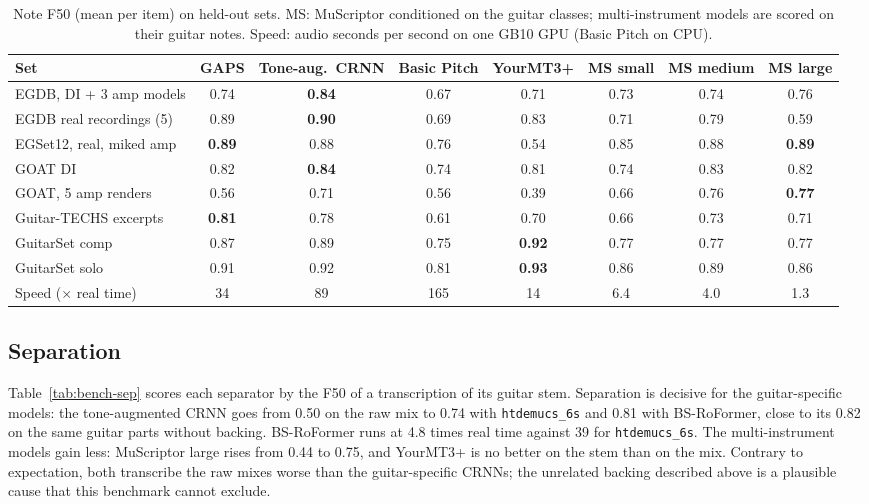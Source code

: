 \begin{table}[t]
\centering
\caption{Note F50 (mean per item) on held-out sets. MS: MuScriptor
conditioned on the guitar classes; multi-instrument models are scored on
their guitar notes. Speed: audio seconds per second on one GB10 GPU (Basic
Pitch on CPU).}
\label{tab:bench-notes}
\footnotesize
\begin{tabular}{@{}lccccccc@{}}
\toprule
Set & GAPS & Tone-aug.\ CRNN & Basic Pitch & YourMT3+ & MS small & MS medium & MS large \\
\midrule
EGDB, DI + 3 amp models & 0.74 & \textbf{0.84} & 0.67 & 0.71 & 0.73 & 0.74 & 0.76 \\
EGDB real recordings (5) & 0.89 & \textbf{0.90} & 0.69 & 0.83 & 0.71 & 0.79 & 0.59 \\
EGSet12, real, miked amp & \textbf{0.89} & 0.88 & 0.76 & 0.54 & 0.85 & 0.88 & \textbf{0.89} \\
GOAT DI & 0.82 & \textbf{0.84} & 0.74 & 0.81 & 0.74 & 0.83 & 0.82 \\
GOAT, 5 amp renders & 0.56 & 0.71 & 0.56 & 0.39 & 0.66 & 0.76 & \textbf{0.77} \\
Guitar-TECHS excerpts & \textbf{0.81} & 0.78 & 0.61 & 0.70 & 0.66 & 0.73 & 0.71 \\
GuitarSet comp & 0.87 & 0.89 & 0.75 & \textbf{0.92} & 0.77 & 0.77 & 0.77 \\
GuitarSet solo & 0.91 & 0.92 & 0.81 & \textbf{0.93} & 0.86 & 0.89 & 0.86 \\
\midrule
Speed (\(\times\) real time) & 34 & 89 & 165 & 14 & 6.4 & 4.0 & 1.3 \\
\bottomrule
\end{tabular}
\end{table}

\subsection{Separation}
Table~\ref{tab:bench-sep} scores each separator by the F50 of a transcription
of its guitar stem. Separation is decisive for the guitar-specific models:
the tone-augmented CRNN goes from 0.50 on the raw mix to 0.74 with
\texttt{htdemucs\_6s} and 0.81 with BS-RoFormer, close to its 0.82 on the same
guitar parts without backing. BS-RoFormer runs at 4.8 times real time against 39 for
\texttt{htdemucs\_6s}. The multi-instrument models gain less: MuScriptor large
rises from 0.44 to 0.75, and YourMT3+ is no better on the stem than on the
mix. Contrary to expectation, both transcribe the raw mixes worse than the
guitar-specific CRNNs; the unrelated backing described above is a plausible
cause that this benchmark cannot exclude.

